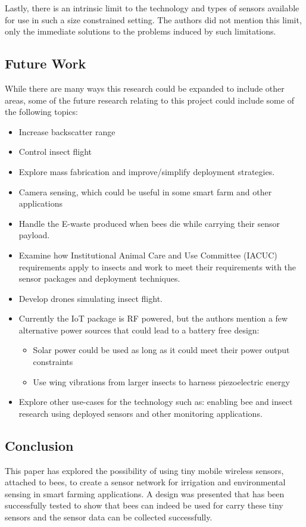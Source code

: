 \documentclass[letterpaper,twocolumn,10pt]{article}
\begin{document}
Lastly, there is an intrinsic limit to the technology and types of sensors available for use in such a size constrained setting. The authors did not mention this limit, only the immediate solutions to the problems induced by such limitations.

\subsection*{Future Work}

While there are many ways this research could be expanded to include other areas, some of the future research relating to this project could include some of the following topics: 

\begin{itemize}
    \item Increase backscatter range
    \item Control insect flight
    \item Explore mass fabrication and improve/simplify deployment strategies.
    \item Camera sensing, which could be useful in some smart farm and other applications
    \item Handle the E-waste produced when bees die while carrying their sensor payload.
    \item Examine how Institutional Animal Care and Use Committee (IACUC) requirements apply to insects and work to meet their requirements with the sensor packages and deployment techniques.
    \item Develop drones simulating insect flight.
    \item Currently the IoT package is RF powered, but the authors mention a few alternative power sources that could lead to a battery free design:
    \begin{itemize}
        \item Solar power could be used as long as it could meet their power output constraints
        \item Use wing vibrations from larger insects to harness piezoelectric energy
    \end{itemize}
    \item Explore other use-cases for the technology such as: enabling bee and insect research using deployed sensors and other monitoring applications.
\end{itemize}


\subsection*{Conclusion}

This paper has explored the possibility of using tiny mobile wireless sensors, attached to bees, to create a sensor network for irrigation and environmental sensing in smart farming applications. A design was presented that has been successfully tested to show that bees can indeed be used for carry these tiny sensors and the sensor data can be collected successfully. 
\end{document}
